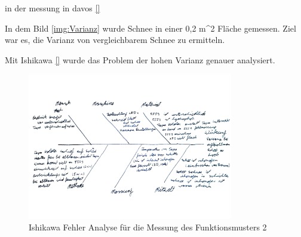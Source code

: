 in der messung in davos \ref{}

In dem Bild \ref{img:Varianz} wurde Schnee in einer 0,2 m^2 Fläche gemessen. Ziel war es, die Varianz von vergleichbarem Schnee zu ermitteln.

Mit Ishikawa \ref{} wurde das Problem der hohen Varianz genauer analysiert.



\begin{figure}
    \centering
    \includegraphics[width=0.8\textwidth]{Bilder/IshikawaDavos.jpg}
    \caption{Ishikawa Fehler Analyse für die Messung des Funktionsmusters 2}
    \label{fig:IshikwaDavos}
\end{figure}




